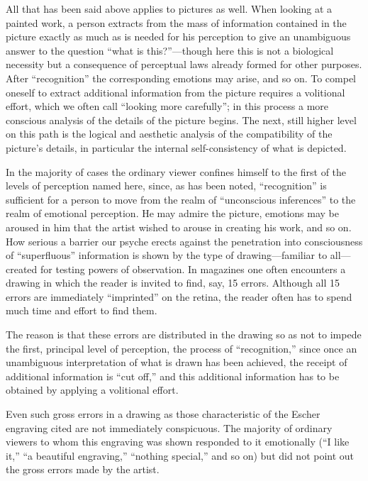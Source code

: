 All that has been said above applies to pictures as well.  When looking at a painted work,
a person extracts from the mass of information contained in the picture exactly as much
as is needed for his perception to give an unambiguous answer to the question ``what is
this?''---though here this is not a biological necessity but a consequence of perceptual
laws already formed for other purposes.  After ``recognition'' the corresponding emotions
may arise, and so on.  To compel oneself to extract additional information from the
picture requires a volitional effort, which we often call ``looking more carefully''; in
this process a more conscious analysis of the details of the picture begins.  The next,
still higher level on this path is the logical and aesthetic analysis of the compatibility
of the picture's details, in particular the internal self-consistency of what is depicted.

In the majority of cases the ordinary viewer confines himself to the first of the levels
of perception named here, since, as has been noted, ``recognition'' is sufficient for a
person to move from the realm of ``unconscious inferences'' to the realm of emotional
perception.  He may admire the picture, emotions may be aroused in him that the artist
wished to arouse in creating his work, and so on.  How serious a barrier our psyche erects
against the penetration into consciousness of ``superfluous'' information is shown by the
type of drawing---familiar to all---created for testing powers of observation.  In
magazines one often encounters a drawing in which the reader is invited to find, say,
15 errors.  Although all 15 errors are immediately ``imprinted'' on the retina, the
reader often has to spend much time and effort to find them.


The reason is that these errors are distributed in the drawing so as not to impede the
first, principal level of perception, the process of ``recognition,'' since once an
unambiguous interpretation of what is drawn has been achieved, the receipt of additional
information is ``cut off,'' and this additional information has to be obtained by applying
a volitional effort.

Even such gross errors in a drawing as those characteristic of the Escher engraving
cited are not immediately conspicuous.  The majority of ordinary viewers to whom this
engraving was shown responded to it emotionally (``I like it,'' ``a beautiful engraving,''
``nothing special,'' and so on) but did not point out the gross errors made by the artist.

